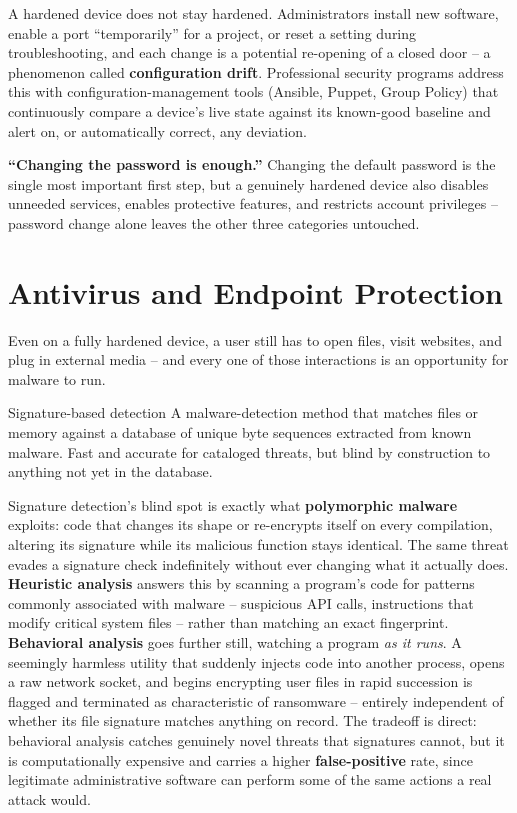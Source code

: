 A hardened device does not stay hardened. Administrators install new software, enable a port
``temporarily'' for a project, or reset a setting during troubleshooting, and each change is a
potential re-opening of a closed door -- a phenomenon called \textbf{configuration drift}.
Professional security programs address this with configuration-management tools (Ansible, Puppet,
Group Policy) that continuously compare a device's live state against its known-good baseline and
alert on, or automatically correct, any deviation.

\begin{misconception}
\textbf{``Changing the password is enough.''} Changing the default password is the single most
important first step, but a genuinely hardened device also disables unneeded services, enables
protective features, and restricts account privileges -- password change alone leaves the other
three categories untouched.
\end{misconception}

\section{Antivirus and Endpoint Protection}

Even on a fully hardened device, a user still has to open files, visit websites, and plug in
external media -- and every one of those interactions is an opportunity for malware to run.

\begin{definition}{Signature-based detection}
A malware-detection method that matches files or memory against a database of unique byte
sequences extracted from known malware. Fast and accurate for cataloged threats, but blind by
construction to anything not yet in the database.
\end{definition}

Signature detection's blind spot is exactly what \textbf{polymorphic malware} exploits: code that
changes its shape or re-encrypts itself on every compilation, altering its signature while its
malicious function stays identical. The same threat evades a signature check indefinitely without
ever changing what it actually does. \textbf{Heuristic analysis} answers this by scanning
a program's code for patterns commonly associated with malware -- suspicious API calls, instructions
that modify critical system files -- rather than matching an exact fingerprint. \textbf{Behavioral
analysis} goes further still, watching a program \emph{as it runs}. A seemingly harmless utility
that suddenly injects code into another process, opens a raw network socket, and begins encrypting
user files in rapid succession is flagged and terminated as characteristic of ransomware -- entirely
independent of whether its file signature matches anything on record. The tradeoff is direct:
behavioral analysis catches genuinely novel threats that signatures cannot, but it is
computationally expensive and carries a higher \textbf{false-positive} rate, since legitimate
administrative software can perform some of the same actions a real attack would.

